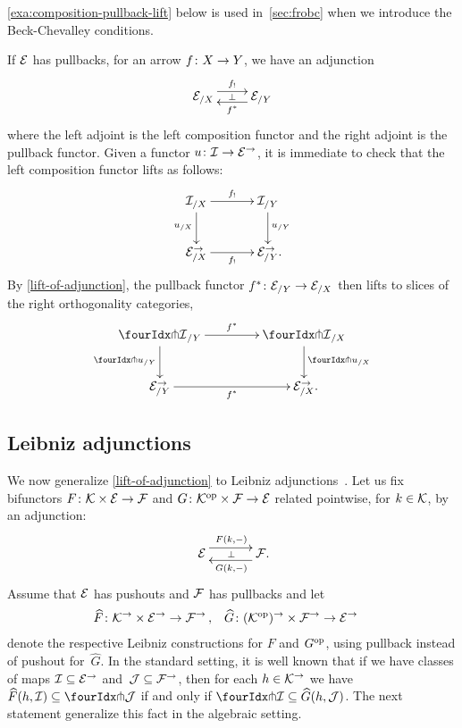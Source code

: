 \documentclass[reqno,10pt,a4paper,oneside,draft]{amsart}
\begin{document}
\cref{exa:composition-pullback-lift} below is used in~\cref{sec:frobc} when we introduce the Beck-Chevalley conditions.

\begin{remark} \label{exa:composition-pullback-lift}
If $\cal{E}$ has pullbacks, for an arrow $f \co X \to Y$, we have an adjunction
\[
\xymatrix{
  \catE_{/X}
  \ar@<1ex>[r]^{f_!}
  \ar@{}[r]|{\bot}
&
  \catE_{/Y}
  \ar@<1ex>[l]^{f^*}
}
\]
where the left adjoint is the left composition functor and the right adjoint is the pullback functor.
Given a functor $u \co \cal{I} \to \catE^\to$, it is immediate to check that the left composition functor lifts as follows:
\[
\xymatrix@C+1em{
  \cal{I}_{/X}
  \ar[r]^-{f_!}
  \ar[d]_{u_{/X}}
&
  \cal{I}_{/Y}
  \ar[d]^{u_{/Y}}
\\
  \calE_{/X}^\to
  \ar[r]_-{f_!}
&
  \calE_{/Y}^\to
\rlap{.}}
\]
By \cref{lift-of-adjunction}, the pullback functor $f^* \co \catE_{/Y} \to \catE_{/X}$ then lifts to slices of the right orthogonality categories,
\[
\xymatrix@C=1.5cm{
  \liftr{\cal{I}}_{/Y}
  \ar[d]_{{\liftr{u}}_{/Y}}
  \ar[r]^{f^*}
&
  \liftr{\cal{I}}_{/X}
  \ar[d]^{{\liftr{u}}_{/X}}
\\
  {\catE}_{/Y}^\to
  \ar[r]_{f^*}
&
  \catE_{/X}^\to
\rlap{.}}
\]
\end{remark}

\subsection*{Leibniz adjunctions}

We now generalize \cref{lift-of-adjunction} to Leibniz adjunctions~\cite{riehl-verity:reedy}.
Let us fix bifunctors $F \co \cal{K} \times \catE \to \cal{F}$ and $G \co \cal{K}^{\op} \times \cal{F} \to \catE$ related pointwise, for $k \in \cal{K}$, by an adjunction:
\[
\xymatrix@C+1em{
  \catE
  \ar@<5pt>[r]^{F(k, \arghole)}
  \ar@{}[r]|{\bot}
&
  \cal{F}
  \ar@<5pt>[l]^{G(k, \arghole)}
\rlap{.}}
\]
Assume that $\catE$ has pushouts and $\cal{F}$ has pullbacks and
let
\[
\begin{aligned}
  \widehat{F} &\co \cal{K}^\to \times \catE^\to \to \cal{F}^\to
\, ,&
  \widehat{G} &\co (\cal{K}^{\op})^\to \times \cal{F}^\to \to \catE^\to
\end{aligned}
\]
denote the respective Leibniz constructions for $F$ and $G^{\op}$, using pullback instead of pushout for~$\widehat{G}$.
In the standard setting, it is well known that if we have classes of maps $\cal{I} \subseteq \catE^\to$ and~$\cal{J} \subseteq \cal{F}^\to$, then for each $h \in \cal{K}^\to$ we have $\widehat{F}(h, \cal{I}) \subseteq \liftl{\cal{J}}$ if and only if $\liftr{\cal{I}} \subseteq \widehat{G}(h, \cal{J})$.
The next statement generalize this fact in the algebraic setting.
\end{document}
